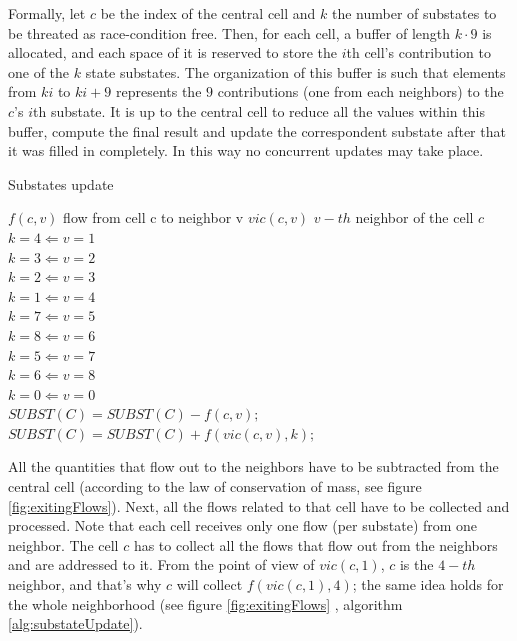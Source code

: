 Formally, let \(c\) be the index of the central cell and \(k\) the number of
substates to be threated as race-condition free. Then, for each cell, a buffer of length \(k
\cdot 9 \) is allocated, and each space of it is reserved to store the \(i\)th cell's
contribution to one of the \(k\) state substates. The organization of this
buffer is such that elements from \(ki\) to \(ki +9\) represents
the \(9\) contributions (one from each neighbors) to the \(c\)'s \(i\)th
substate.
It is up to the central cell to reduce all the values within this buffer,
compute the final result and update the correspondent substate after that it
was filled in completely.
In this way no concurrent updates may take place.

\begin{algorithm}
\caption{Substates update}
\begin{algorithmic}
\label{alg:substateUpdate}
\REQUIRE \(f(c,v)\) flow from cell c to neighbor v
\REQUIRE \(vic(c,v)\) \(v-th\) neighbor of the cell \(c\)
\ENSURE \hfill \\
\(k=4 \Leftarrow v=1\) \\
\(k=3 \Leftarrow v=2\) \\
\(k=2 \Leftarrow v=3\) \\
\(k=1 \Leftarrow v=4\) \\
\(k=7 \Leftarrow v=5\) \\
\(k=8 \Leftarrow v=6\) \\
\(k=5 \Leftarrow v=7\) \\
\(k=6 \Leftarrow v=8\) \\
\(k=0 \Leftarrow v=0\) \\
\STATE \(SUBST(C) = SUBST(C) - f(c,v);\)
\STATE \(SUBST(C) = SUBST(C) + f(vic(c,v),k);\)


\ENDFOR
\ENDFOR
\end{algorithmic}
\end{algorithm}

All the quantities that flow out to the neighbors have to be subtracted from
the central cell (according to the law of conservation of mass, see
figure \ref{fig:exitingFlows}). Next, all the flows related to that cell have
to be collected and processed. Note that each cell receives only one flow (per
substate) from one neighbor. The cell \(c\) has to collect all the flows that
flow out from the neighbors and are addressed to it. From the point of view of
\(vic(c,1)\), \(c\) is the \(4-th\) neighbor, and that's why \(c\) will collect
\(f(vic(c,1),4)\); the same idea holds for the whole neighborhood (see figure
\ref{fig:exitingFlows} , algorithm \ref{alg:substateUpdate}).




